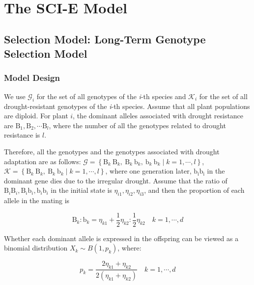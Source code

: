 \documentclass{mcmthesis}
\begin{document}
\section{The SCI-E Model}

\subsection{Selection Model: Long-Term Genotype Selection Model}

\subsubsection{Model Design}

\indent

We use $\mathcal{G}_i$ for the set of all genotypes of the \textit{i}-th species and $\mathcal{K}_i$ for the set of all drought-resistant genotypes of the \textit{i}-th species. Assume that all plant populations are diploid. For plant $i$, the dominant alleles associated with drought resistance are $\mathrm{B}_1, \mathrm{B}_2, \cdots \mathrm{B}_l$, where the number of all the genotypes related to drought resistance is $l$. 

Therefore, all the genotypes and the genotypes associated with drought adaptation are as follows: $\mathcal{G}  =\left\{\mathrm{B}_k \mathrm{~B}_k, \mathrm{~B}_k \mathrm{~b}_k, \mathrm{~b}_k \mathrm{~b}_k \mid k=1, \cdots, l\right\}$, $\mathcal{K}  =\left\{\mathrm{B}_k \mathrm{~B}_k, \mathrm{~B}_k \mathrm{~b}_k \mid k=1, \cdots, l\right\}$, where one generation later, $\mathrm{b}_{\mathrm{i}} \mathrm{b}_{\mathrm{i}}$ in the dominant gene dies due to the irregular drought. Assume that the ratio of $\mathrm{B}_i \mathrm{B}_i, \mathrm{B}_i \mathrm{b}_i, \mathrm{b}_i \mathrm{b}_i$ in the initial state is $\eta_{i 1}, \eta_{i 2}, \eta_{i 3}$, and  then the proportion of each allele in the mating is

\begin{equation}
\mathrm{B}_k: \mathrm{b}_k=\eta_{k 1}+\frac{1}{2} \eta_{k 2}: \frac{1}{2} \eta_{k 2} \quad k=1, \cdots, d
\end{equation}

Whether each dominant allele is expressed in the offspring can be viewed as a binomial distribution $X_k \sim B\left(1, p_k\right)$, where:

\begin{equation}
p_k=\frac{2 \eta_{k 1}+\eta_{k 2}}{2\left(\eta_{k 1}+\eta_{k 2}\right)} \quad k=1, \cdots, d
\end{equation}
\end{document}
